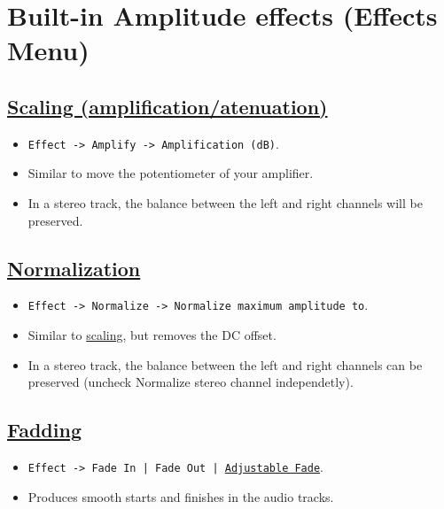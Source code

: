 \chapter{Built-in Amplitude effects (Effects Menu)}

\section{\href{http://manual.audacityteam.org/o/man/amplify.html}{Scaling (amplification/atenuation)}}
\begin{itemize}
\item \verb|Effect -> Amplify -> Amplification (dB)|.
\item Similar to move the potentiometer of your amplifier.
\item In a stereo track, the balance between the left and right
  channels will be preserved.
\end{itemize}

\section{\href{http://manual.audacityteam.org/o/man/normalize.html}{Normalization}}
\begin{itemize}
\item \verb|Effect -> Normalize -> Normalize maximum amplitude to|.
\item Similar to
  \href{http://manual.audacityteam.org/o/man/amplify_and_normalize.html}{scaling},
  but removes the DC offset.
\item In a stereo track, the balance between the left and right
  channels can be preserved (uncheck Normalize stereo channel
  independetly).
\end{itemize}

\section{\href{http://manual.audacityteam.org/o/man/fades.html\#linearfade}{Fadding}}
\begin{itemize}
\item \texttt{Effect -> Fade In | Fade Out |
    \href{http://manual.audacityteam.org/o/man/adjustable_fade.html}{Adjustable
      Fade}}.
\item Produces smooth starts and finishes in the audio tracks. 
\end{itemize}

